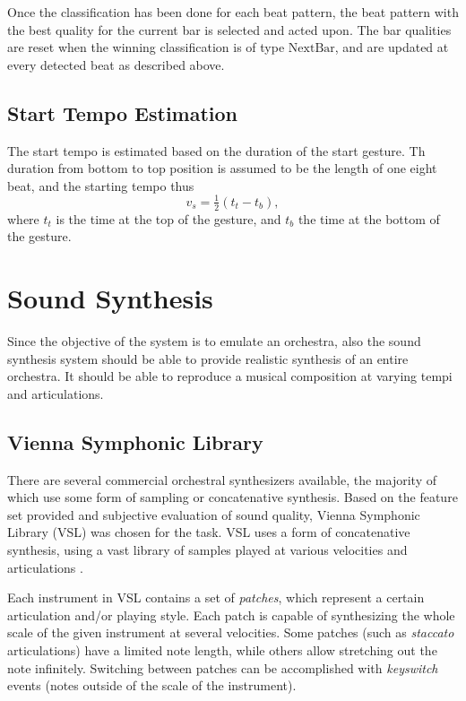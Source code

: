 Once the classification has been done for each beat pattern,
the beat pattern with the best quality for the current bar
is selected and acted upon.
The bar qualities are reset when the winning classification
is of type $\mathrm{NextBar}$,
and are updated at every detected beat as described above.

\section{Start Tempo Estimation}
\label{sec:meth:start_tempo_estimation}

The start tempo is estimated based on
the duration of the start gesture.
Th duration from bottom to top position is
assumed to be the length of one eight beat,
and the starting tempo thus
\begin{equation}
v_s = \tfrac{1}{2} (t_t - t_b),
\end{equation}
where $t_t$ is the time at the top of the gesture,
and $t_b$ the time at the bottom of the gesture.


\chapter{Sound Synthesis}
\label{chapter:sound_synthesis}

Since the objective of the system is to emulate an orchestra,
also the sound synthesis system should be able to
provide realistic synthesis of an entire orchestra.
It should be able to reproduce a musical composition
at varying tempi and articulations.

\section{Vienna Symphonic Library}

There are several commercial orchestral synthesizers available,
the majority of which use some form of sampling or concatenative synthesis.
Based on the feature set provided and
subjective evaluation of sound quality,
Vienna Symphonic Library (VSL) \cite{vsl} was chosen for the task.
VSL uses a form of concatenative synthesis,
using a vast library of samples played at
various velocities and articulations \cite{schwartz2006}.

Each instrument in VSL contains a set of \textit{patches},
which represent a certain articulation and/or playing style.
Each patch is capable of synthesizing
the whole scale of the given instrument at several velocities.
Some patches (such as \textit{staccato} articulations)
have a limited note length,
while others allow stretching out the note infinitely.
Switching between patches can be accomplished with \textit{keyswitch} events
(notes outside of the scale of the instrument).


